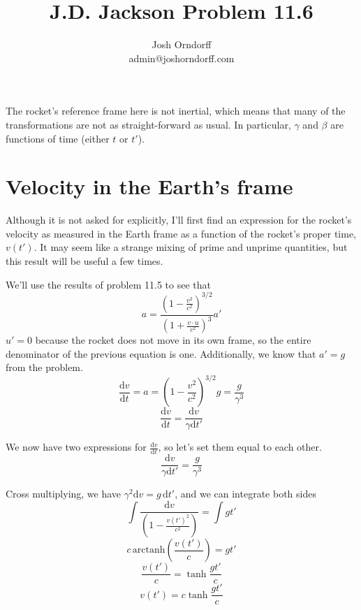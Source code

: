 \documentclass[10pt,a4paper]{article}
\begin{document}
\title{J.D. Jackson Problem 11.6}
\author{Josh Orndorff \\ admin@joshorndorff.com}
\maketitle


The rocket's reference frame here is not inertial, which means that many of the transformations are not as straight-forward as usual.  In particular, $\gamma$ and $\beta$ are functions of time (either $t$ or $t'$).
\section{Velocity in the Earth's frame}
Although it is not asked for explicitly, I'll first find an expression for the rocket's velocity as measured in the Earth frame as a function of the rocket's proper time, $v(t')$. It may seem like a strange mixing of prime and unprime quantities, but this result will be useful a few times.

We'll use the results of problem 11.5  to see that
\begin{equation}
a=\frac{(1-\frac{v^2}{c^2})^{3/2}}{(1+\frac{v\cdot u}{c^2})^3} a'
\end{equation}
$u'=0$ because the rocket does not move in its own frame, so the entire denominator of the previous equation is one. Additionally, we know that $a'=g$ from the problem.
\begin{equation}
\frac{\mathrm{d}v}{\mathrm{d}t}=a=\left(1-\frac{v^2}{c^2}\right)^{3/2} g=\frac{g}{\gamma^3}
\end{equation}
\begin{equation}
\frac{\mathrm{d}v}{\mathrm{d}t}=\frac{\mathrm{d}v}{\gamma\mathrm{d}t'}
\end{equation}

We now have two expressions for $\frac{\mathrm{d}v}{\mathrm{d}t}$, so let's set them equal to each other.
\begin{equation}
\frac{\mathrm{d}v}{\gamma\mathrm{d}t'}=\frac{g}{\gamma^3}
\end{equation}

Cross multiplying, we have  $\gamma^2 \mathrm{d}v=g\,\mathrm{d}t'$, and we can integrate both sides
\begin{equation}
\int\frac{\mathrm{d}v}{\left(1-\frac{v(t')^2}{c^2}\right)}=\int g t'
\end{equation}
\begin{equation}
c \,\mathrm{arctanh}\left(\frac{v(t')}{c}\right)=gt'
\end{equation}
\begin{equation}\label{v/c of t'}
\frac{v(t')}{c}=\tanh\frac{gt'}{c}
\end{equation}
\begin{equation}\label{v of t'}
v(t')=c\tanh\frac{gt'}{c}
\end{equation}
\end{document}
